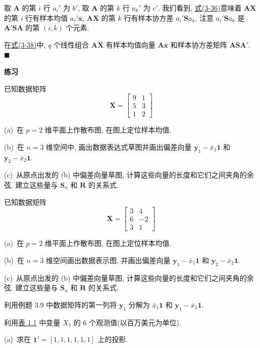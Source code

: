 取 $\mathbf{A}$ 的第 $i$ 行 $a_i'$ 为 $b'$, 取 $\mathbf{A}$ 的第 $k$ 行 $a_k'$ 为 $c'$, 我们看到, \hyperref[eq:3-36]{式(3-36)}意味着 $\mathbf{A}\mathbf{X}$ 的第 $i$ 行有样本均值 $a_i'\bar{\mathbf{x}}$, $\mathbf{A}\mathbf{X}$ 的第 $k$ 行有样本协方差 $a_i'\mathbf{S}a_k$, 注意 $a_i'\mathbf{S}a_k$ 是 $\mathbf{A}'\mathbf{S}\mathbf{A}$ 的第 $(i,k)$ 个元素.

 在\hyperref[eq:3-38]{式(3-38)}中, $q$ 个线性组合 $\mathbf{A}\mathbf{X}$ 有样本均值向量 $\mathbf{A}\bar{\mathbf{x}}$ 和样本协方差矩阵 $\mathbf{A}\mathbf{S}\mathbf{A}'$. \hfill$\blacksquare$

\vspace{6pt}
{\large\bfseries 练习}

\medskip
{}\quad 已知数据矩阵
\[
\mathbf{X}=\begin{bmatrix}
9&1\\
5&3\\
1&2
\end{bmatrix}
\]

(a)\ 在 $p=2$ 维平面上作散布图, 在图上定位样本均值.

(b)\ 在 $n=3$ 维空间中, 画出数据表达式草图并画出偏差向量 $\mathbf{y}_1-\bar{x}_1\mathbf{1}$ 和 $\mathbf{y}_2-\bar{x}_2\mathbf{1}$.

(c)\ 从原点出发的 (b) 中偏差向量草图, 计算这些向量的长度和它们之间夹角的余弦. 建立这些量与 $\mathbf{S}_n$ 和 $\mathbf{R}$ 的关系式.

\quad 已知数据矩阵
\[
\mathbf{X}=\begin{bmatrix}
3&4\\
6&-2\\
3&1
\end{bmatrix}
\]

(a)\ 在 $p=2$ 维平面上作散布图, 在图上定位样本均值.

(b)\ 在 $n=3$ 维空间画出数据表示图, 并画出偏差向量 $\mathbf{y}_1-\bar{x}_1\mathbf{1}$ 和 $\mathbf{y}_2-\bar{x}_2\mathbf{1}$.

(c)\ 从原点出发的 (b) 中偏差向量草图, 计算这些向量的长度和它们之间夹角的余弦. 建立这些量与 $\mathbf{S}_n$ 和 $\mathbf{R}$ 的关系式.

\quad 利用例题 3.9 中数据矩阵的第一列将 $\mathbf{y}_1$ 分解为 $\bar{x}_1\mathbf{1}$ 和 $\mathbf{y}_1-\bar{x}_1\mathbf{1}$.

\quad 利用\hyperref[tab:1.1]{表 1.1} 中变量 $X_1$ 的 6 个观测值(以百万美元为单位).

(a)\ 求在 $\mathbf{1}'=[1,1,1,1,1,1]$ 上的投影.

